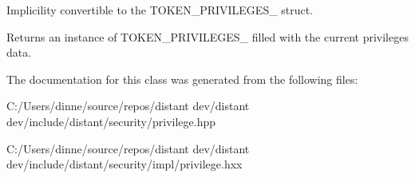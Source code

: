 Implicility convertible to the T\+O\+K\+E\+N\+\_\+\+P\+R\+I\+V\+I\+L\+E\+G\+E\+S\+\_\+ struct. \begin{DoxyReturn}{Returns}
an instance of T\+O\+K\+E\+N\+\_\+\+P\+R\+I\+V\+I\+L\+E\+G\+E\+S\+\_\+ filled with the current privilege\textquotesingle{}s data. 
\end{DoxyReturn}


The documentation for this class was generated from the following files\+:\begin{DoxyCompactItemize}
\item 
C\+:/\+Users/dinne/source/repos/distant dev/distant dev/include/distant/security/privilege.\+hpp\item 
C\+:/\+Users/dinne/source/repos/distant dev/distant dev/include/distant/security/impl/privilege.\+hxx\end{DoxyCompactItemize}

